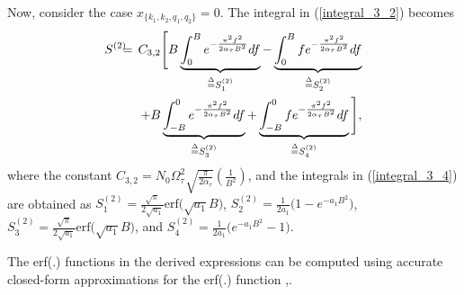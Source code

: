 Now, consider the case $x_{\{k_1,k_2,q_1,q_2\}}=0$.
The integral in (\ref{integral_3_2}) becomes
\begin{eqnarray}
S^{(2)} & \hspace{-2mm} = & \hspace{-2mm} C_{3,2}\Bigg[B\underbrace{\int_{0}^{B}e^{-\frac{\pi^{2}f^{2}}{2\alpha_{\tau} B^{2}}}df}_{\overset{\Delta}{=}S_1^{(2)}}-\underbrace{\int_{0}^{B}fe^{-\frac{\pi^{2}f^{2}}{2\alpha_{\tau} B^{2}}}df}_{\overset{\Delta}{=}S_2^{(2)}} \nonumber \\
& \hspace{-2mm} & \hspace{-2mm} +B\underbrace{\int_{-B}^{0}e^{-\frac{\pi^{2}f^{2}}{2\alpha_{\tau} B^{2}}}df}_{\overset{\Delta}{=}S_3^{(2)}} + \underbrace{\int_{-B}^{0}fe^{-\frac{\pi^{2}f^{2}}{2\alpha_{\tau} B^{2}}}df}_{\overset{\Delta}{=}S_4^{(2)}} \Bigg],
\label{integral_3_4}
\end{eqnarray}
where the constant $C_{3,2}=N_{0}\Omega_{\tau}^{2}\sqrt{\frac{\pi}{2\alpha_{\tau}}}\left(\frac{1}{B^{2}}\right)$, and the integrals in (\ref{integral_3_4}) are obtained as
$S_1^{(2)}=\frac{\sqrt{\pi}}{2\sqrt{a_1}}\mathrm{erf}\big(\sqrt{a_1}B\big)$,
$S_2^{(2)}=\frac{1}{2a_1}\big(1-e^{-a_1 B^{2}}\big)$,
$S_3^{(2)}=\frac{\sqrt{\pi}}{2\sqrt{a_1}}\mathrm{erf}\big(\sqrt{a_1}B\big)$,
and
$S_4^{(2)}=\frac{1}{2a_1}\big(e^{-a_1 B^{2}}-1\big)$.

The erf(.) functions in the derived expressions can be computed using accurate closed-form approximations for the erf(.) function \cite{erf1},\cite{erf2}.